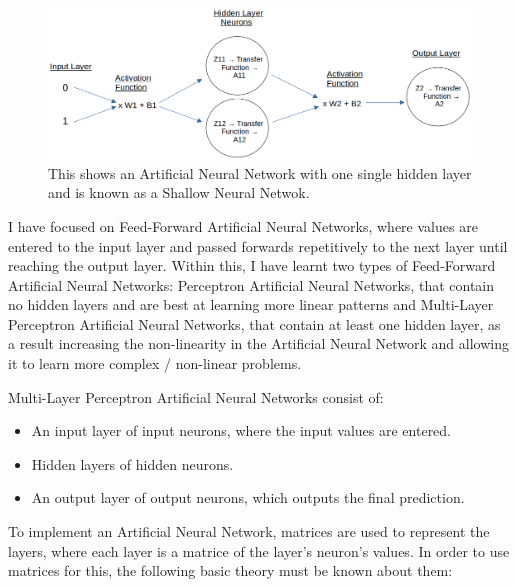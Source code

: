 \documentclass[./project-report/src/latex/project-report.tex]{subfiles}
\begin{document}
\begin{figure}[h!]
\centering
\includegraphics[width=1\textwidth]{./project-report/src/images/shallow-ann-diagram.png}
\caption{This shows an Artificial Neural Network with one single hidden layer and is known as a Shallow Neural Netwok.}
\end{figure}

I have focused on Feed-Forward Artificial Neural Networks, where values are entered to the input layer and passed forwards repetitively to the next layer until 
reaching the output layer. Within this, I have learnt two types of Feed-Forward Artificial Neural Networks: Perceptron Artificial Neural Networks, that contain no 
hidden layers and are best at learning more linear patterns and Multi-Layer Perceptron Artificial Neural Networks, that contain at least one hidden layer, as a result 
increasing the non-linearity in the Artificial Neural Network and allowing it to learn more complex / non-linear problems.
\vspace{5mm}

Multi-Layer Perceptron Artificial Neural Networks consist of:

\begin{itemize}
    \item An input layer of input neurons, where the input values are entered.
    \item Hidden layers of hidden neurons.
    \item An output layer of output neurons, which outputs the final prediction.
\end{itemize}

To implement an Artificial Neural Network, matrices are used to represent the layers, where each layer is a matrice of the layer's neuron's values. In 
order to use matrices for this, the following basic theory must be known about them:
\end{document}
